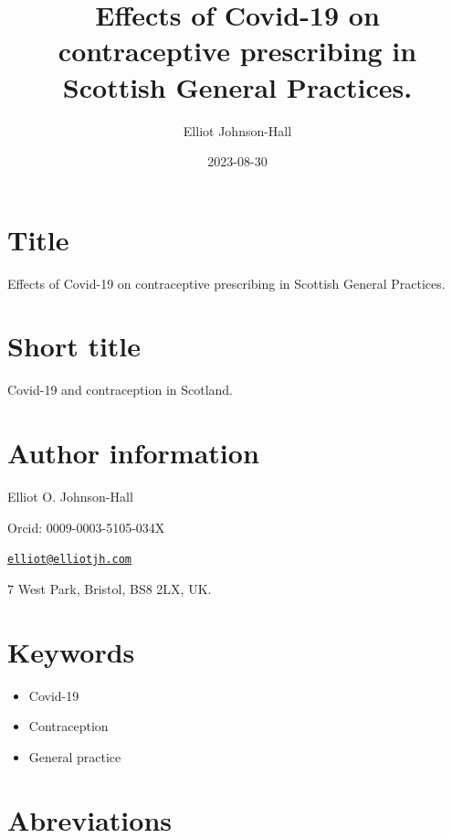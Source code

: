 \documentclass[
]{article}
\title{Effects of Covid-19 on contraceptive prescribing in Scottish
General Practices.}
\author{Elliot Johnson-Hall}
\date{2023-08-30}
\providecommand{\tightlist}{%
  \setlength{\itemsep}{0pt}\setlength{\parskip}{0pt}}
\begin{document}
\maketitle


\hypertarget{title}{%
\section*{Title}\label{title}}

Effects of Covid-19 on contraceptive prescribing in Scottish General
Practices.

\hypertarget{short-title}{%
\section*{Short title}\label{short-title}}

Covid-19 and contraception in Scotland.

\hypertarget{author-information}{%
\section*{Author information}\label{author-information}}

Elliot O. Johnson-Hall

Orcid: 0009-0003-5105-034X

\href{mailto:elliot@elliotjh.com}{\nolinkurl{elliot@elliotjh.com}}

7 West Park, Bristol, BS8 2LX, UK.

\hypertarget{keywords}{%
\section*{Keywords}\label{keywords}}

\begin{itemize}
\tightlist
\item
  Covid-19
\item
  Contraception
\item
  General practice \newpage
\end{itemize}

\hypertarget{abreviations}{%
\section*{Abreviations}\label{abreviations}}
\end{document}
